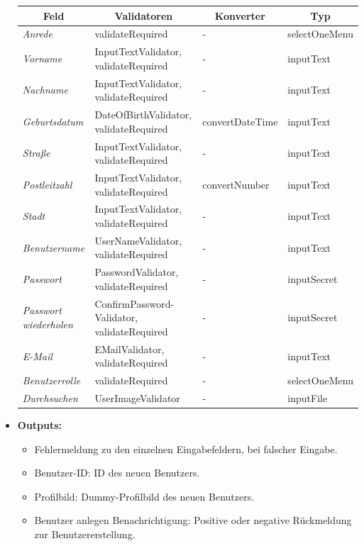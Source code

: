 \begin{itemize}
\begin{center}
\begin{longtable}{|p{3cm} | p{4cm} | p{3cm} |p{3cm}|}
						\hline \multicolumn{1}{|c|}{\textbf{Feld}} & \multicolumn{1}{|c|}{\textbf{Validatoren}}  &  \multicolumn{1}{|c|}{\textbf{Konverter}} &  \multicolumn{1}{|c|}{\textbf{Typ}} \\ \hline
						\endfirsthead
						\hline
						\endlastfoot
						\textit{Anrede} & validateRequired & - & selectOneMenu\\ \hline
						\textit{Vorname} & InputTextValidator, validateRequired & - & inputText\\ \hline
						\textit{Nachname} & InputTextValidator, validateRequired & - & inputText\\ \hline
						\textit{Geburtsdatum} & DateOfBirthValidator, validateRequired & convertDateTime & inputText\\ \hline
						\textit{Straße} & InputTextValidator, validateRequired & - & inputText\\ \hline
						\textit{Postleitzahl} & InputTextValidator, validateRequired & convertNumber & inputText\\ \hline	
						\textit{Stadt} & InputTextValidator, validateRequired & - & inputText\\ \hline
						\textit{Benutzername} & UserNameValidator, validateRequired & - & inputText\\ \hline	
						\textit{Passwort} & PasswordValidator, validateRequired & - & inputSecret\\ \hline	
						\textit{Passwort wiederholen} & ConfirmPassword-Validator, validateRequired & - & inputSecret\\ \hline
						\textit{E-Mail} & EMailValidator, validateRequired & - & inputText\\ \hline
						\textit{Benutzerrolle} & validateRequired & - & selectOneMenu\\ \hline
						\textit{Durchsuchen} & UserImageValidator & - & inputFile\\ \hline
					\end{longtable}
				\end{center}
			\item \textbf{Outputs:}
			\begin{itemize}
				\item Fehlermeldung zu den einzelnen Eingabefeldern, bei falscher Eingabe.
				\item Benutzer-ID: ID des neuen Benutzers.
				\item Profilbild: Dummy-Profilbild des neuen Benutzers.
				\item Benutzer anlegen Benachrichtigung: Positive oder negative Rückmeldung zur Benutzererstellung.
			\end{itemize}
					\begin{center}
						\begin{longtable}{|p{5cm} | p{4cm}|p{3cm}|}
							

\end{longtable}
\end{center}
\end{itemize}
